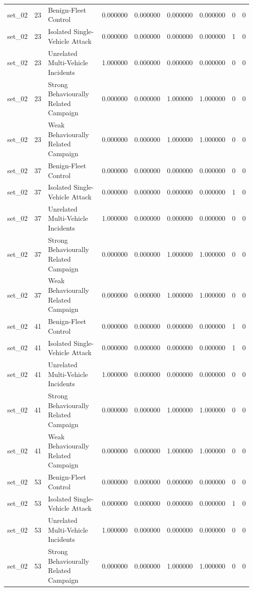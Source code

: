 \begin{tabular}{lrlrrrrrr}
set_02 & 23 & Benign-Fleet Control & 0.000000 & 0.000000 & 0.000000 & 0.000000 & 0 & 0 \\
set_02 & 23 & Isolated Single-Vehicle Attack & 0.000000 & 0.000000 & 0.000000 & 0.000000 & 1 & 0 \\
set_02 & 23 & Unrelated Multi-Vehicle Incidents & 1.000000 & 0.000000 & 0.000000 & 0.000000 & 0 & 0 \\
set_02 & 23 & Strong Behaviourally Related Campaign & 0.000000 & 0.000000 & 1.000000 & 1.000000 & 0 & 0 \\
set_02 & 23 & Weak Behaviourally Related Campaign & 0.000000 & 0.000000 & 1.000000 & 1.000000 & 0 & 0 \\
set_02 & 37 & Benign-Fleet Control & 0.000000 & 0.000000 & 0.000000 & 0.000000 & 0 & 0 \\
set_02 & 37 & Isolated Single-Vehicle Attack & 0.000000 & 0.000000 & 0.000000 & 0.000000 & 1 & 0 \\
set_02 & 37 & Unrelated Multi-Vehicle Incidents & 1.000000 & 0.000000 & 0.000000 & 0.000000 & 0 & 0 \\
set_02 & 37 & Strong Behaviourally Related Campaign & 0.000000 & 0.000000 & 1.000000 & 1.000000 & 0 & 0 \\
set_02 & 37 & Weak Behaviourally Related Campaign & 0.000000 & 0.000000 & 1.000000 & 1.000000 & 0 & 0 \\
set_02 & 41 & Benign-Fleet Control & 0.000000 & 0.000000 & 0.000000 & 0.000000 & 1 & 0 \\
set_02 & 41 & Isolated Single-Vehicle Attack & 0.000000 & 0.000000 & 0.000000 & 0.000000 & 1 & 0 \\
set_02 & 41 & Unrelated Multi-Vehicle Incidents & 1.000000 & 0.000000 & 0.000000 & 0.000000 & 0 & 0 \\
set_02 & 41 & Strong Behaviourally Related Campaign & 0.000000 & 0.000000 & 1.000000 & 1.000000 & 0 & 0 \\
set_02 & 41 & Weak Behaviourally Related Campaign & 0.000000 & 0.000000 & 1.000000 & 1.000000 & 0 & 0 \\
set_02 & 53 & Benign-Fleet Control & 0.000000 & 0.000000 & 0.000000 & 0.000000 & 0 & 0 \\
set_02 & 53 & Isolated Single-Vehicle Attack & 0.000000 & 0.000000 & 0.000000 & 0.000000 & 1 & 0 \\
set_02 & 53 & Unrelated Multi-Vehicle Incidents & 1.000000 & 0.000000 & 0.000000 & 0.000000 & 0 & 0 \\
set_02 & 53 & Strong Behaviourally Related Campaign & 0.000000 & 0.000000 & 1.000000 & 1.000000 & 0 & 0 \\

\end{tabular}
